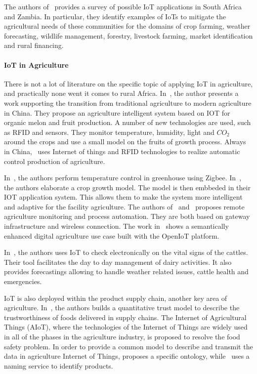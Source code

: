 The authors of~\cite{Dlodlo2015} provides a survey of possible IoT applications in South Africa and Zambia.
In particular, they identify examples of IoTs to mitigate the agricultural needs of these communities for the domains of crop farming, weather forecasting, wildlife management, forestry, livestock farming, market identification and rural financing.


\paragraph{IoT in Agriculture}
There is not a lot of literature on the specific topic of applying IoT in agriculture, and practically none went it comes to rural Africa.
In~\cite{Bing2012}, the author presents a work supporting the transition from traditional agriculture to modern agriculture in China.
They propose an agriculture intelligent system based on IOT for organic melon and fruit production. 
A number of new technologies are used, such as RFID and sensors.
They monitor temperature, humidity, light and $CO_2$ around the crops and use a small model on the fruits of growth process.
Always in China,~\cite{TongKe2013} uses Internet of things and RFID technologies to realize automatic control production of agriculture.

In~\cite{Dan2015}, the authors perform temperature control in greenhouse using Zigbee.
In~\cite{Hu2011a}, the authors elaborate a crop growth model.
The model is then embbeded in their IOT application system.
This allows them to make the system more intelligent and adaptive for the facility agriculture.
The authors of~\cite{Nakutis2015} and~\cite{Sarkar2016} proposes remote agriculture monitoring and process automation.
They are both based on gateway infrastructure and wireless connection.
The work in~\cite{Jayaraman2015} shows a semantically enhanced digital agriculture use case built with the OpenIoT platform.

In~\cite{Ilapakurti2015}, the authors uses IoT to check electronically on the vital signs of the cattles.
Their tool facilitates the day to day management of dairy activities.
It also provides forecastings allowing to handle weather related issues, cattle health and emergencies.

IoT is also deployed within the product supply chain, another key area of agriculture.
In~\cite{Han2014}, the authors builds a quantitative trust model to describe the trustworthiness of foods delivered in supply chains.
The Internet of Agricultural Things (AIoT), where the technologies of the Internet of Things are widely used in all of the phases in the agriculture industry, is proposed to resolve the food safety problem.
In order to provide a common model to describe and transmit the data in agriculture Internet of Things, \cite{Hu2011} proposes a specific ontology, while~\cite{Liu2014} uses a naming service to identify products.


